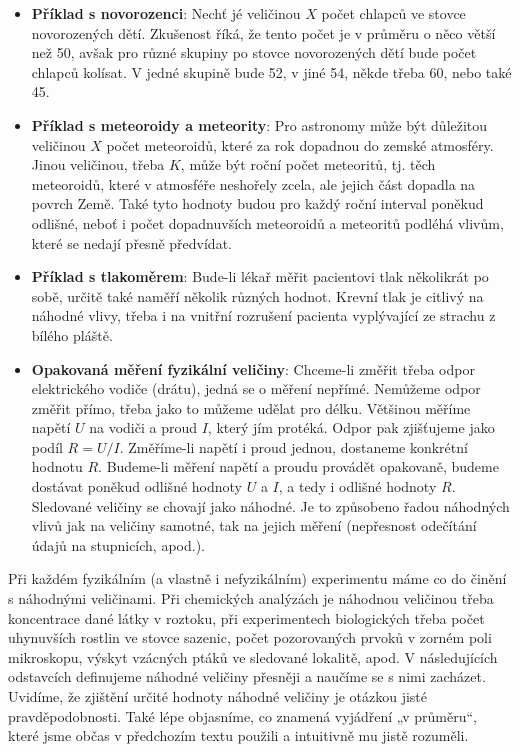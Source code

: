     \begin{itemize}
      \item \textbf{Příklad s novorozenci}: Nechť jé veličinou \(X\) počet chlapců ve stovce 
            novorozených dětí. Zkušenost říká, že tento počet je v průměru o něco větší než 
            \num{50}, avšak pro různé skupiny po stovce novorozených dětí bude počet chlapců 
            kolísat. V jedné skupině bude \num{52}, v jiné \num{54}, někde třeba \num{60}, nebo 
            také \num{45}.
      \item \textbf{Příklad s meteoroidy a meteority}: Pro astronomy může být důležitou veličinou 
            \(X\) počet meteoroidů, které za rok dopadnou do zemské atmosféry. Jinou veličinou, 
            třeba \(K\), může být roční počet meteoritů, tj. těch meteoroidů, které v atmosféře 
            neshořely zcela, ale jejich část dopadla na povrch Země. Také tyto hodnoty budou pro 
            každý roční interval poněkud odlišné, neboť i počet dopadnuvších meteoroidů a 
            meteoritů podléhá vlivům, které se nedají přesně předvídat.
      \item \textbf{ Příklad s tlakoměrem}: Bude-li lékař měřit pacientovi tlak několikrát po 
            sobě, určitě také naměří několik různých hodnot. Krevní tlak je citlivý na náhodné 
            vlivy, třeba i na vnitřní rozrušení pacienta vyplývající ze strachu z bílého pláště.
      \item \textbf{Opakovaná měření fyzikální veličiny}: Chceme-li změřit třeba odpor elektrického
            vodiče (drátu), jedná se o měření nepřímé. Nemůžeme odpor změřit přímo, třeba jako      
            to můžeme udělat pro délku. Většinou měříme napětí \(U\) na vodiči a proud \(I\), který 
            jím protéká. Odpor pak zjišťujeme jako podíl \(R = U/I\). Změříme-li napětí i proud 
            jednou, dostaneme konkrétní hodnotu \(R\). Budeme-li měření napětí a proudu provádět 
            opakovaně, budeme dostávat poněkud odlišné hodnoty \(U\) a \(I\), a tedy i odlišné 
            hodnoty \(R\). Sledované veličiny se chovají jako náhodné. Je to způsobeno řadou 
            náhodných vlivů jak na veličiny samotné, tak na jejich měření (nepřesnost odečítání 
            údajů na stupnicích, apod.).
    \end{itemize}
  
    Při každém fyzikálním (a vlastně i nefyzikálním) experimentu máme co do činění s náhodnými 
    veličinami. Při chemických analýzách je náhodnou veličinou třeba koncentrace dané látky
    v roztoku, při experimentech biologických třeba počet uhynuvších rostlin ve stovce sazenic, 
    počet pozorovaných prvoků v zorném poli mikroskopu, výskyt vzácných ptáků ve sledované 
    lokalitě, apod. V následujících odstavcích definujeme náhodné veličiny přesněji a naučíme se s 
    nimi zacházet. Uvidíme, že zjištění určité hodnoty náhodné veličiny je otázkou jisté 
    pravděpodobnosti. Také lépe objasníme, co znamená vyjádření „v průměru“, které jsme občas v 
    předchozím textu použili a intuitivně mu jistě rozuměli.
  

